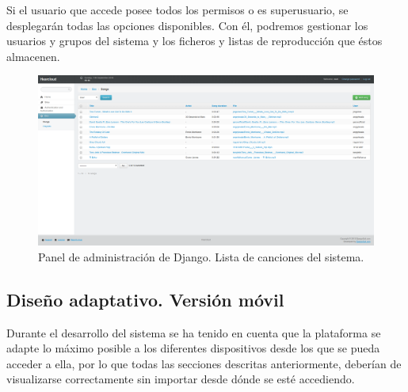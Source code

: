 Si el usuario que accede posee todos los permisos o es superusuario, se desplegarán todas las opciones disponibles. Con él, podremos gestionar los usuarios y grupos del sistema y los ficheros y listas de reproducción que éstos almacenen.

\begin{figure}[H] 
\centering 
\includegraphics[scale=0.2]{../images/um/um_9.png}
\caption{Panel de administración de Django. Lista de canciones del sistema.}
\end{figure}

\subsection{Diseño adaptativo. Versión móvil}

Durante el desarrollo del sistema se ha tenido en cuenta que la plataforma se adapte lo máximo posible a los diferentes dispositivos desde los que se pueda acceder a ella, por lo que todas las secciones descritas anteriormente, deberían de visualizarse correctamente sin importar desde dónde se esté accediendo.

